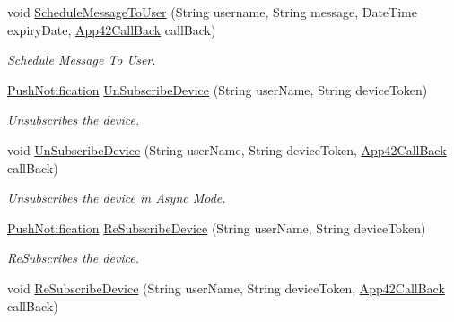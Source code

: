 \begin{DoxyCompactItemize}
void \hyperlink{classcom_1_1shephertz_1_1app42_1_1paas_1_1sdk_1_1csharp_1_1push_notification_1_1_push_notification_service_ad75505c06e0aa28a06bb6e9d0e34c830}{Schedule\+Message\+To\+User} (String username, String message, Date\+Time expiry\+Date, \hyperlink{interfacecom_1_1shephertz_1_1app42_1_1paas_1_1sdk_1_1csharp_1_1_app42_call_back}{App42\+Call\+Back} call\+Back)
\begin{DoxyCompactList}\small\item\em Schedule Message To User. \end{DoxyCompactList}\item 
\hyperlink{classcom_1_1shephertz_1_1app42_1_1paas_1_1sdk_1_1csharp_1_1push_notification_1_1_push_notification}{Push\+Notification} \hyperlink{classcom_1_1shephertz_1_1app42_1_1paas_1_1sdk_1_1csharp_1_1push_notification_1_1_push_notification_service_a7adecfd1e5dd7e4a0c0f55201e25ec54}{Un\+Subscribe\+Device} (String user\+Name, String device\+Token)
\begin{DoxyCompactList}\small\item\em Unsubscribes the device. \end{DoxyCompactList}\item 
void \hyperlink{classcom_1_1shephertz_1_1app42_1_1paas_1_1sdk_1_1csharp_1_1push_notification_1_1_push_notification_service_a0fd7f26f061810dc063014fc819186d7}{Un\+Subscribe\+Device} (String user\+Name, String device\+Token, \hyperlink{interfacecom_1_1shephertz_1_1app42_1_1paas_1_1sdk_1_1csharp_1_1_app42_call_back}{App42\+Call\+Back} call\+Back)
\begin{DoxyCompactList}\small\item\em Unsubscribes the device in Async Mode. \end{DoxyCompactList}\item 
\hyperlink{classcom_1_1shephertz_1_1app42_1_1paas_1_1sdk_1_1csharp_1_1push_notification_1_1_push_notification}{Push\+Notification} \hyperlink{classcom_1_1shephertz_1_1app42_1_1paas_1_1sdk_1_1csharp_1_1push_notification_1_1_push_notification_service_ae9eb2d10b645aa1274151272b295ceed}{Re\+Subscribe\+Device} (String user\+Name, String device\+Token)
\begin{DoxyCompactList}\small\item\em Re\+Subscribes the device. \end{DoxyCompactList}\item 
void \hyperlink{classcom_1_1shephertz_1_1app42_1_1paas_1_1sdk_1_1csharp_1_1push_notification_1_1_push_notification_service_ac9ec9e18d0f5839ceb54ccf341740489}{Re\+Subscribe\+Device} (String user\+Name, String device\+Token, \hyperlink{interfacecom_1_1shephertz_1_1app42_1_1paas_1_1sdk_1_1csharp_1_1_app42_call_back}{App42\+Call\+Back} call\+Back)

\end{DoxyCompactItemize}
